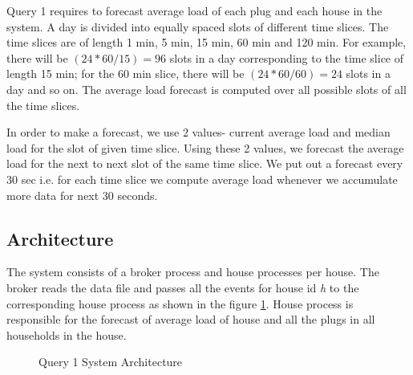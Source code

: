 Query 1 requires to forecast average load of each plug and each house in the system. A day is divided into equally spaced slots of different time slices. The time slices are of length 1 min, 5 min, 15 min, 60 min and 120 min. For example, there will be $(24*60/15) = 96$ slots in a day corresponding to the time slice of length 15 min; for the 60 min slice, there will be $(24*60/60) = 24$ slots in a day and so on. The average load forecast is computed over all possible slots of all the time slices.

In order to make a forecast, we use 2 values- current average load and median load for the slot of given time slice. Using these 2 values, we forecast the average load for the next to next slot of the same time slice. We put out a forecast every 30 sec i.e. for each time slice we compute average load whenever we accumulate more data for next 30 seconds.


\subsection{Architecture}
The system consists of a broker process and house processes per house. The broker reads the data file and passes all the events for house id \textit{h} to the corresponding house process as shown in the figure \ref{fig:sysarch1}. House process is responsible for the forecast of average load of house and all the plugs in all households in the house.

\begin{figure}[h]
\begin{center}
\caption{Query 1 System Architecture}
\end{center}
\label{fig:sysarch1}
\end{figure}

